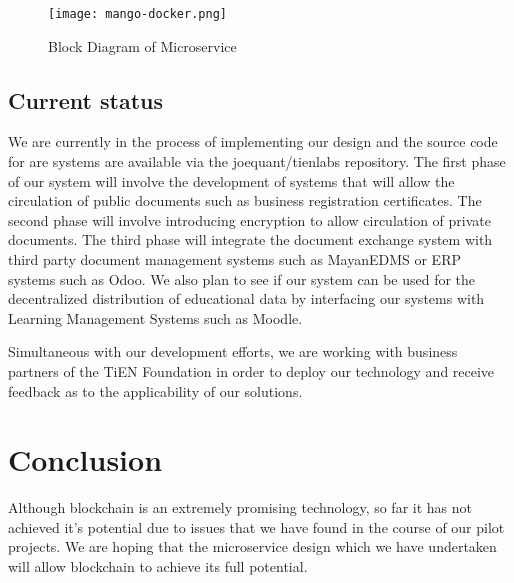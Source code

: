 \documentclass[journal]{IEEEtran}
\begin{document}
\begin{comment}
@startuml

package "Docker Image" {
  [GraphJS API]
  [Git Repository]
  [Mango Interface]
}

cloud {
  [Ethereum Blockchain]
}

cloud {
  [IPFS Data Store]
}

[Document] --> [GraphJS API]
[GraphJS API] --> [Git Repository]
[Git Repository] --> [Mango Interface]
[Mango Interface] --> [Ethereum Blockchain]
[Mango Interface] --> [IPFS Data Store]

@enduml
\end{comment}
\begin{figure}
  \texttt{[image: mango-docker.png]}
  \caption{Block Diagram of Microservice}
\end{figure}

\subsection{Current status}

We are currently in the process of implementing our design and the
source code for are systems are available via the joequant/tienlabs
repository.  The first phase of our system will involve the
development of systems that will allow the circulation of public
documents such as business registration certificates.  The second
phase will involve introducing encryption to allow circulation of
private documents.  The third phase will integrate the document
exchange system with third party document management systems such as
MayanEDMS or ERP systems such as Odoo.  We also plan to see if our
system can be used for the decentralized distribution of educational
data by interfacing our systems with Learning Management Systems such
as Moodle.

Simultaneous with our development efforts, we are working with
business partners of the TiEN Foundation in order to deploy our
technology and receive feedback as to the applicability of our
solutions.

\section{Conclusion}
Although blockchain is an extremely promising technology, so far it
has not achieved it's potential due to issues that we have found in
the course of our pilot projects.  We are hoping that the microservice
design which we have undertaken will allow blockchain to achieve its
full potential.
\end{document}
